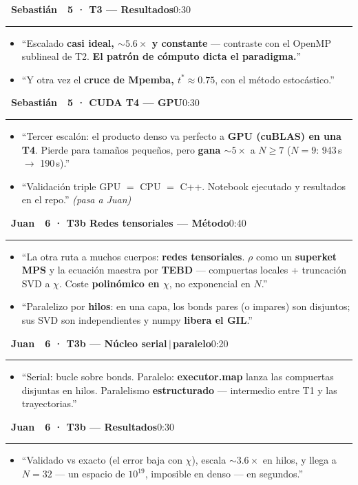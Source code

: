 \documentclass[11pt,a4paper]{article}
\newcommand{\Jb}{\colorbox{juan}{\color{white}\bfseries\footnotesize~Juan~}}
\newcommand{\Sb}{\colorbox{seb}{\color{white}\bfseries\footnotesize~Sebastián~}}
\newcommand{\cs}[1]{\textcolor{seb}{\textbf{#1}}}
\newcommand{\blk}[3]{%
  \par\medskip\noindent #1\ \textbf{#2}\hfill\textcolor{soft}{\small #3}\par
  \vspace{-4pt}\textcolor{soft!40}{\rule{\linewidth}{0.4pt}}\par\vspace{-2pt}}
\begin{document}
\blk{\Sb}{5 · T3 --- Resultados}{0:30}
\begin{itemize}
  \item ``Escalado \textbf{casi ideal, $\sim5.6\times$ y constante} --- contraste con
    el OpenMP sublineal de T2. \textbf{El patrón de cómputo dicta el paradigma.}''
  \item ``Y otra vez el \textbf{cruce de Mpemba, $t^*\approx0.75$}, con el método estocástico.''
\end{itemize}

\blk{\Sb}{5 · CUDA T4 --- GPU}{0:30}
\begin{itemize}
  \item ``Tercer escalón: el producto denso va perfecto a \textbf{GPU (cuBLAS) en una
    T4}. Pierde para tamaños pequeños, pero \textbf{gana $\sim5\times$} a $N\ge7$
    ($N{=}9$: 943\,s $\to$ 190\,s).''
  \item ``Validación triple GPU $=$ CPU $=$ C++. Notebook ejecutado y resultados en el
    repo.'' \emph{(pasa a Juan)}
\end{itemize}

\blk{\Jb}{6 · T3b Redes tensoriales --- Método}{0:40}
\begin{itemize}
  \item ``La otra ruta a muchos cuerpos: \textbf{redes tensoriales}. $\rho$ como un
    \textbf{superket MPS} y la ecuación maestra por \textbf{TEBD} --- compuertas
    locales + truncación SVD a $\chi$. Coste \textbf{polinómico en $\chi$}, no
    exponencial en $N$.''
  \item ``Paralelizo por \textbf{hilos}: en una capa, los bonds pares (o impares) son
    disjuntos; sus SVD son independientes y numpy \textbf{libera el GIL}.''
\end{itemize}

\blk{\Jb}{6 · T3b --- Núcleo serial\,$\vert$\,paralelo}{0:20}
\begin{itemize}
  \item ``Serial: bucle sobre bonds. Paralelo: \cs{executor.map} lanza las compuertas
    disjuntas en hilos. Paralelismo \textbf{estructurado} --- intermedio entre T1 y las
    trayectorias.''
\end{itemize}

\blk{\Jb}{6 · T3b --- Resultados}{0:30}
\begin{itemize}
  \item ``Validado vs exacto (el error baja con $\chi$), escala $\sim3.6\times$ en
    hilos, y llega a \textbf{$N=32$} --- un espacio de $10^{19}$, imposible en denso ---
    en segundos.''
\end{itemize}
\end{document}
